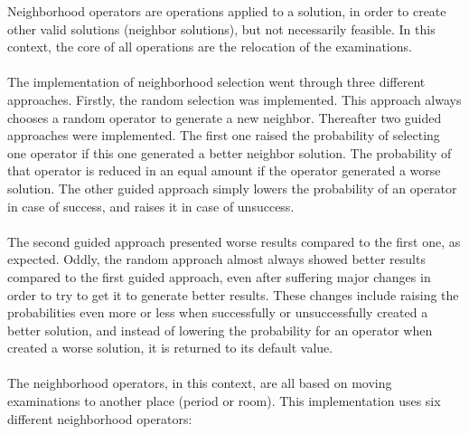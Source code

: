 Neighborhood operators are operations applied to a solution, in order to create other valid solutions (neighbor solutions), but not necessarily feasible. In this context, the core of all operations are the relocation of the examinations.\\
\\
The implementation of neighborhood selection went through three different approaches. Firstly, the random selection was implemented. This approach always chooses a random operator to generate a new neighbor. Thereafter two guided approaches were implemented. The first one raised the probability of selecting one operator if this one generated a better neighbor solution. The probability of that operator is reduced in an equal amount if the operator generated a worse solution. The other guided approach simply lowers the probability of an operator in case of success, and raises it in case of unsuccess. \\
\\
The second guided approach presented worse results compared to the first one, as expected. Oddly, the random approach almost always showed better results compared to the first guided approach, even after suffering major changes in order to try to get it to generate better results. These changes include raising the probabilities even more or less when successfully or unsuccessfully created a better solution, and instead of lowering the probability for an operator when created a worse solution, it is returned to its default value.\\
\\
The neighborhood operators, in this context, are all based on moving examinations to another place (period or room). This implementation uses six different neighborhood operators:
\\
